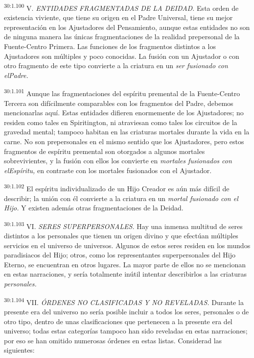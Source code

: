 \par
\textsuperscript{30:1.100} V. \textit{ENTIDADES FRAGMENTADAS DE LA DEIDAD.} Esta orden de existencia viviente, que tiene su origen en el Padre Universal, tiene su mejor representación en los Ajustadores del Pensamiento, aunque estas entidades no son de ninguna manera las únicas fragmentaciones de la realidad prepersonal de la Fuente-Centro Primera. Las funciones de los fragmentos distintos a los Ajustadores son múltiples y poco conocidas. La fusión con un Ajustador o con otro fragmento de este tipo convierte a la criatura en un \textit{ser fusionado con elPadre.}

\par
\textsuperscript{30:1.101} Aunque las fragmentaciones del espíritu premental de la Fuente-Centro Tercera son difícilmente comparables con los fragmentos del Padre, debemos mencionarlas aquí. Estas entidades difieren enormemente de los Ajustadores; no residen como tales en Spiritington, ni atraviesan como tales los circuitos de la gravedad mental; tampoco habitan en las criaturas mortales durante la vida en la carne. No son prepersonales en el mismo sentido que los Ajustadores, pero estos fragmentos de espíritu premental son otorgados a algunos mortales sobrevivientes, y la fusión con ellos los convierte en \textit{mortales fusionados con elEspíritu,} en contraste con los mortales fusionados con el Ajustador.

\par
\textsuperscript{30:1.102} El espíritu individualizado de un Hijo Creador es aún más difícil de describir; la unión con él convierte a la criatura en un \textit{mortal fusionado con el Hijo.} Y existen además otras fragmentaciones de la Deidad.

\par
\textsuperscript{30:1.103} VI. \textit{SERES SUPERPERSONALES.} Hay una inmensa multitud de seres distintos a los personales que tienen un origen divino y que efectúan múltiples servicios en el universo de universos. Algunos de estos seres residen en los mundos paradisiacos del Hijo; otros, como los representantes superpersonales del Hijo Eterno, se encuentran en otros lugares. La mayor parte de ellos no se mencionan en estas narraciones, y sería totalmente inútil intentar describirlos a las criaturas \textit{personales.}

\par
\textsuperscript{30:1.104} VII. \textit{ÓRDENES NO CLASIFICADAS Y NO REVELADAS.} Durante la presente era del universo no sería posible incluir a todos los seres, personales o de otro tipo, dentro de unas clasificaciones que pertenecen a la presente era del universo; todas estas categorías tampoco han sido reveladas en estas narraciones; por eso se han omitido numerosas órdenes en estas listas. Considerad las siguientes:

